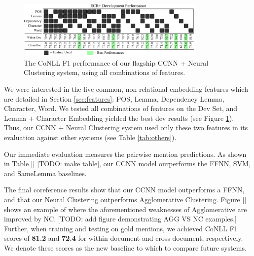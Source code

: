 \begin{figure}[h]
\centering
	\includegraphics[width=0.82\textwidth]{graphics/features.pdf}
	\caption{The CoNLL F1 performance of our flagship CCNN + Neural Clustering system, using all combinations of features.}
	\label{fig:allfeatures}
\end{figure}

We were interested in the five common, non-relational embedding features which are detailed in Section \ref{sec:features}: POS, Lemma, Dependency Lemma, Character, Word.  We tested all combinations of features on the Dev Set, and Lemma + Character Embedding yielded the best dev results (see Figure \ref{fig:allfeatures}).  Thus, our CCNN + Neural Clustering system used only these two features in its evaluation against other systems (see Table \ref{tab:others}).  

Our immediate evaluation measures the pairwise mention predictions.  As shown in Table \ref{} [TODO: make table], our CCNN model ourperforms the FFNN, SVM, and SameLemma baselines.

The final coreference results show that our CCNN model outperforms a FFNN, and that our Neural Clustering outperforms Agglomerative Clustering.  Figure \ref{} shows an example of where the aforementioned weaknesses of Agglomerative are improved by NC. [TODO: add figure demonstrating AGG VS NC examples.]  Further, when training and testing on gold mentions, we achieved CoNLL F1 scores of \textbf{81.2} and \textbf{72.4} for within-document and cross-document, respectively.  We denote these scores as the new baseline to which to compare future systems.

